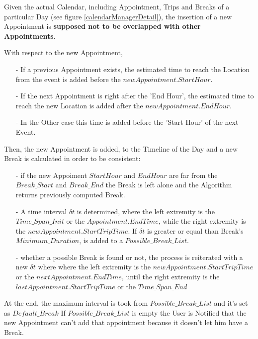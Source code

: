 	Given the actual Calendar, including Appointment, Trips and Breaks of a particular Day (see figure \ref{calendarManagerDetail}), the insertion of a new Appointment is \textbf{supposed not to be overlapped with other Appointments}.
	
	With respect to the new Appointment, 
	\begin{itemize}
		\item[-] If a previous Appointment exists, the estimated time to reach the Location from the event is added before the $newAppointment.StartHour$.
		\item[-] If the next Appointment is right after the 'End Hour', the estimated time to reach the new Location is added after the $newAppointment.EndHour$.
		\item[-] In the Other case this time is added before the 'Start Hour' of the next Event.
	\end{itemize}
	
	Then, the new Appointment is added, to the Timeline of the Day and a new Break is calculated in order to be consistent:
	\begin{itemize}
		\item[-] if the new Appoiment $StartHour$  and $EndHour$ are far from the $Break\_Start$ and $Break\_End$ the Break is left alone and the Algorithm returns previously computed Break.
		\item[-] A time interval $\delta t$ is determined, where the left extremity is the $Time\_Span\_Init$ or the $Appointment.EndTime$, while the right extremity is the $newAppointment.StartTripTime$.
		If $\delta t$ is greater or equal than Break's $Minimum\_Duration$, is added to a $Possible\_Break\_List$.
		
		\item[-] whether a possible Break is found or not, the process is reiterated with a new $\delta t$ where where the left extremity is the $newAppointment.StartTripTime$ or the $nextAppointment.EndTime$, until the right extremity is the $lastAppointment.StartTripTime$ or the $Time\_Span\_End$
 	\end{itemize}
 	
 	At the end, the maximum interval is took from $Possible\_Break\_List$ and it's set as $Default\_Break$
 	If $Possible\_Break\_List$ is empty the User is Notified that the new Appointment can't add that appointment because it doesn't let him have a Break.
 	
 	\vfill
	
	\vfill

